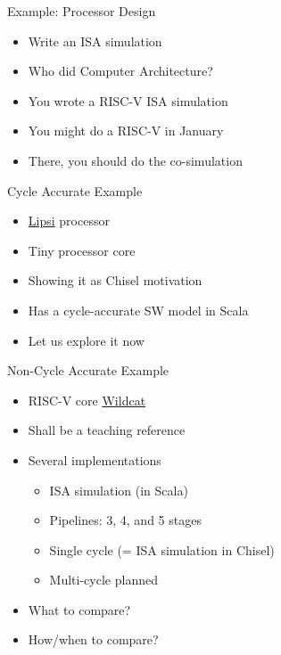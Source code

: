 \begin{frame}[fragile]{Example: Processor Design}
\begin{itemize}
\item Write an ISA simulation
\item Who did Computer Architecture?
\item You wrote a RISC-V ISA simulation
\item You might do a RISC-V in January
\item There, you should do the co-simulation
\end{itemize}
\end{frame}

\begin{frame}[fragile]{Cycle Accurate Example}
\begin{itemize}
\item \href{https://github.com/schoeberl/lipsi}{Lipsi} processor
\item Tiny processor core
\item Showing it as Chisel motivation
\item Has a cycle-accurate SW model in Scala
\item Let us explore it now
\end{itemize}
\end{frame}

\begin{frame}[fragile]{Non-Cycle Accurate Example}
\begin{itemize}
\item RISC-V core \href{https://github.com/schoeberl/wildcat}{Wildcat}
\item Shall be a teaching reference
\item Several implementations
\begin{itemize}
\item ISA simulation (in Scala)
\item Pipelines: 3, 4, and 5 stages
\item Single cycle (= ISA simulation in Chisel)
\item Multi-cycle planned
\end{itemize}
\item What to compare?
\item How/when to compare?
\end{itemize}
\end{frame}

